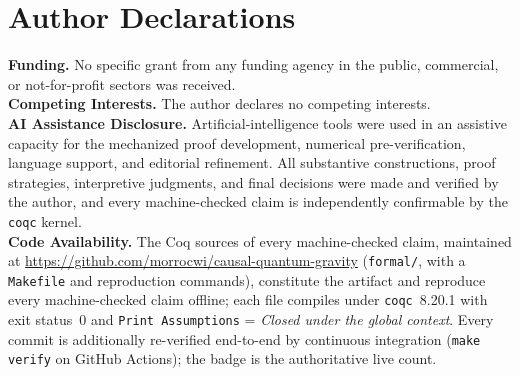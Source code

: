 \documentclass[10pt,twocolumn]{article}
\theoremstyle{definition}
\newcommand{\code}[1]{\texttt{#1}}
\begin{document}
\section*{Author Declarations}
\textbf{Funding.} No specific grant from any funding agency in the public, commercial, or
not-for-profit sectors was received.\\[0.25em]
\textbf{Competing Interests.} The author declares no competing interests.\\[0.25em]
\textbf{AI Assistance Disclosure.} Artificial-intelligence tools were used in an assistive
capacity for the mechanized proof development, numerical pre-verification, language support,
and editorial refinement. All substantive constructions, proof strategies, interpretive
judgments, and final decisions were made and verified by the author, and every machine-checked
claim is independently confirmable by the \code{coqc} kernel.\\[0.25em]
\textbf{Code Availability.} The Coq sources of every machine-checked claim, maintained at
\url{https://github.com/morrocwi/causal-quantum-gravity} (\code{formal/}, with a \code{Makefile}
and reproduction commands), constitute the artifact and reproduce every machine-checked claim
offline; each file compiles under \code{coqc}~8.20.1 with exit status~0 and
\code{Print Assumptions} = \emph{Closed under the global context}. Every commit is additionally
re-verified end-to-end by continuous integration (\code{make verify} on GitHub Actions); the
badge is the authoritative live count.





\end{document}
